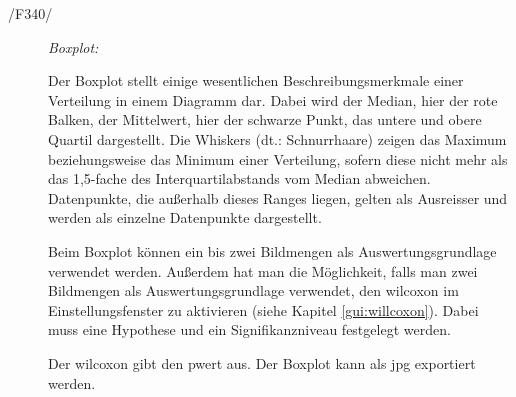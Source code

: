 \begin{description}
		\item[/F340/] \textit{Boxplot:}\par 
			\begin{figure}[H]
				\centering
			\end{figure}
			Der Boxplot stellt einige wesentlichen Beschreibungsmerkmale einer Verteilung in einem Diagramm dar. Dabei wird der Median, hier der rote Balken, der Mittelwert, hier der schwarze Punkt, das untere und obere Quartil dargestellt. Die Whiskers (dt.: Schnurrhaare) zeigen das Maximum beziehungsweise das Minimum einer Verteilung, sofern diese nicht mehr als das 1,5-fache des Interquartilabstands vom Median abweichen. Datenpunkte, die außerhalb dieses Ranges liegen, gelten als Ausreisser und werden als einzelne Datenpunkte dargestellt.
			\par
			Beim Boxplot können ein bis zwei Bildmengen als Auswertungsgrundlage verwendet werden. Außerdem hat man die Möglichkeit, falls man zwei Bildmengen als Auswertungsgrundlage verwendet, den \gls{wilcoxon} im Einstellungsfenster zu aktivieren (siehe Kapitel \ref{gui:willcoxon}). Dabei muss eine Hypothese und ein Signifikanzniveau festgelegt werden.
\par Der \gls{wilcoxon} gibt den \gls{pwert} aus. Der Boxplot kann als \gls{jpg} exportiert werden.


\end{description}
